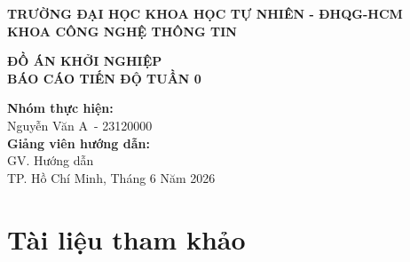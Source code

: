\documentclass[12pt,a4paper]{article}
\newcommand{\weeknumber}{0}
\newcommand{\reporttitle}{BÁO CÁO TIẾN ĐỘ TUẦN \weeknumber}
\newcommand{\subject}{ĐỒ ÁN KHỞI NGHIỆP}
\newcommand{\studentname}{Nguyễn Văn A}
\newcommand{\studentid}{23120000}
\newcommand{\instructor}{GV. Hướng dẫn}
\begin{document}
\begin{titlepage}
    \begin{center}
        \large
        \textbf{TRƯỜNG ĐẠI HỌC KHOA HỌC TỰ NHIÊN - ĐHQG-HCM} \\
        \textbf{KHOA CÔNG NGHỆ THÔNG TIN} \\
        \vspace{1cm}
        \vspace{1.5cm}
        
        \Large
        \textcolor{primary}{\textbf{\subject}} \\
        \vspace{1cm}
        \huge
        \textcolor{primary}{\textbf{\reporttitle}} \\
        \vspace{1.5cm}
        
        \large
        \textbf{Nhóm thực hiện:} \\
        \studentname\ - \studentid \\
        \vspace{1cm}
        \textbf{Giảng viên hướng dẫn:} \\
        \instructor \\
        
        \vfill
        \large
        TP. Hồ Chí Minh, Tháng 6 Năm 2026
    \end{center}
\end{titlepage}

\newpage
\tableofcontents
\newpage




\section{Tài liệu tham khảo}


\end{document}

